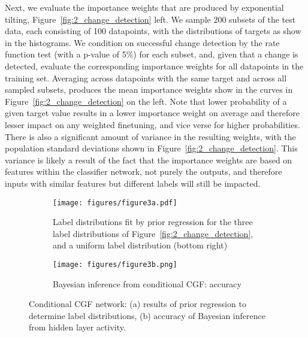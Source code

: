 \documentclass{article}      %
\begin{document}
Next, we evaluate the importance weights that are produced by exponential tilting, Figure~\ref{fig:2_change_detection} left.
We sample 200 subsets of the test data, each consisting of 100 datapoints, with the distributions of targets as show in the histograms.
We condition on successful change detection by the rate function test (with a p-value of 5\%) for each subset, and, given that a change is detected, evaluate the corresponding importance weights for all datapoints in the training set.
Averaging across datapoints with the same target and across all sampled subsets, produces the mean importance weights show in the curves in Figure~\ref{fig:2_change_detection} on the left.
Note that lower probability of a given target value results in a lower importance weight on average and therefore lesser impact on any weighted finetuning, and vice verse for higher probabilities.
There is also a significant amount of variance in the resulting weights, with the population standard deviations shown in Figure~\ref{fig:2_change_detection}.
This variance is likely a result of the fact that the importance weights are based on features within the classifier network, not purely the outputs, and therefore inputs with similar features but different labels will still be impacted.



\begin{figure}[tb]
  \centering
  \begin{subfigure}[t]{0.5\textwidth}
    \centering
    \texttt{[image: figures/figure3a.pdf]}
    \caption{Label distributions fit by prior regression for the three label distributions of Figure~\ref{fig:2_change_detection}, and a uniform label distribution (bottom right)}
    \label{fig:3a_prior_regression}
  \end{subfigure}
  \begin{subfigure}[t]{0.5\textwidth}
    \centering
    \texttt{[image: figures/figure3b.png]}
    \caption{Bayesian inference from conditional CGF: accuracy}
    \label{fig:3b_accuracy}
  \end{subfigure}
  \caption{Conditional CGF network: (a) results of prior regression to determine label distributions, (b) accuracy of Bayesian inference from hidden layer activity.}
  \label{fig:3_condtional_cgf}
\end{figure}
\end{document}
